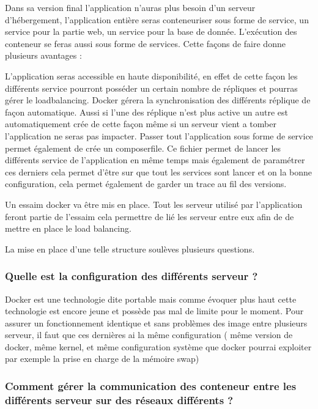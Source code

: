 \par Dans sa version final l’application n’auras plus besoin d’un serveur d’hébergement, l’application entière seras conteneuriser sous forme de service, un service pour la partie web, un service pour la base de donnée. L’exécution des conteneur se feras aussi sous forme de services. Cette façons de faire donne plusieurs avantages : 

\par L’application seras accessible en haute disponibilité, en effet de cette façon les différents service pourront posséder un certain nombre de répliques et pourras gérer le loadbalancing. Docker gérera la synchronisation des différents réplique de façon automatique. Aussi si l’une des réplique n’est plus active un autre est automatiquement crée de cette façon même si un serveur vient a tomber l’application ne seras pas impacter. Passer tout l’application sous forme de service permet également de crée un composerfile. Ce fichier permet de lancer les différents service de l’application en même temps mais également de paramétrer ces derniers cela permet d’être sur que tout les services sont lancer et on la bonne configuration, cela permet également de garder un trace au fil des versions.

\par Un essaim docker va être mis en place. Tout les serveur utilisé par l’application feront partie de l’essaim cela permettre de lié les serveur entre eux afin de de mettre en place le load balancing.

\par La mise en place d’une telle structure soulèves plusieurs questions.

	\subsubsection{Quelle est la configuration des différents serveur ?} 

Docker est une technologie dite portable mais comme évoquer plus haut cette technologie est encore jeune et possède pas mal de limite pour le moment. Pour assurer un fonctionnement identique et sans problèmes des image entre plusieurs serveur, il faut que ces dernières ai la même configuration ( même version de docker, même kernel, et même configuration système que docker pourrai exploiter par exemple la prise en charge de la mémoire swap) 

	\subsubsection{Comment gérer la communication des conteneur entre les différents serveur sur des réseaux différents ?} 

